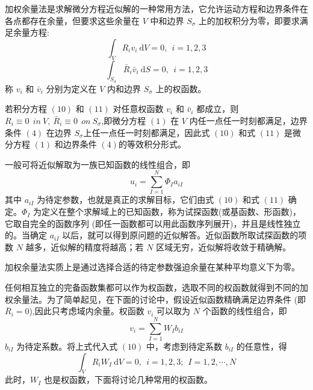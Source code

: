 \documentclass[12pt,a4paper]{article}
\begin{document}
加权余量法是求解微分方程近似解的一种常用方法，它允许运动方程和边界条件在各点都存在余量，但要求这些余量在 $V$ 中和边界 $S_{\sigma}$ 上的加权积分为零，即要求满足余量方程:
\begin{equation}
\int_{V} R_iv_i ~ \mathrm{d}V=0,~~ i=1,2,3
\end{equation}
\begin{equation}
\int_{S_{\sigma}} \bar{R}_i\bar{v}_i ~ \mathrm{d}S=0,~~ i=1,2,3
\end{equation}
称 $v_i$ 和 $\bar{v}_i$ 分别为定义在 $V$ 内和边界 $S_{\sigma}$ 上的权函数。

若积分方程 $(10)$ 和 $(11)$ 对任意权函数 $v_i$ 和 $\bar{v}_i$ 都成立，则 $R_i\equiv 0 ~~in~V,~\bar{R}_i\equiv 0 ~~on~S_{\sigma}$,即微分方程 $(1)$ 在 $V$ 内任一点任一时刻都满足，边界条件 $(4)$ 在边界 $S_{\sigma}$上任一点任一时刻都满足，因此式 $(10)$ 和式 $(11)$ 是微分方程 $(1)$ 和边界条件 $(4)$的等效积分形式。

一般可将近似解取为一族已知函数的线性组合，即
\begin{equation}
u_i=\sum_{I=1}^N \Phi_I a_{iI}
\end{equation}
其中 $a_{iI}$ 为待定参数，也就是真正的求解目标，它们由式 $(10)$ 和式 $(11)$ 确定。$\Phi_I$ 为定义在整个求解域上的已知函数，称为试探函数(或基函数、形函数)，它取自完全的函数序列 (即任一函数都可以用此函数序列展开)，并且是线性独立的。当确定 $a_{iI}$ 以后，就可以得到原问题的近似解答。近似函数所取试探函数的项数 $N$ 越多，近似解的精度将越高；若 $N$ 区域无穷，近似解将收敛于精确解。

加权余量法实质上是通过选择合适的待定参数强迫余量在某种平均意义下为零。

任何相互独立的完备函数集都可以作为权函数，选取不同的权函数就得到不同的加权余量法。为了简单起见，在下面的讨论中，假设近似函数精确满足边界条件 (即 $\bar{R}_i = 0$),因此只考虑域内余量。权函数 $v_i$ 可以取为 $N$ 个函数的线性组合，即
\begin{equation}
v_i=\sum_{I=1}^N W_I b_{iI}
\end{equation}
$b_{iI}$ 为待定系数。将上式代入式 $(10)$ 中，考虑到待定系数 $b_{iI}$ 的任意性，得
\begin{equation}
\int_{V} R_iW_I ~ \mathrm{d}V=0,~~i=1,2,3;~~I=1,2,\cdots ,N
\end{equation}
此时，$W_I$ 也是权函数，下面将讨论几种常用的权函数。
\end{document}
